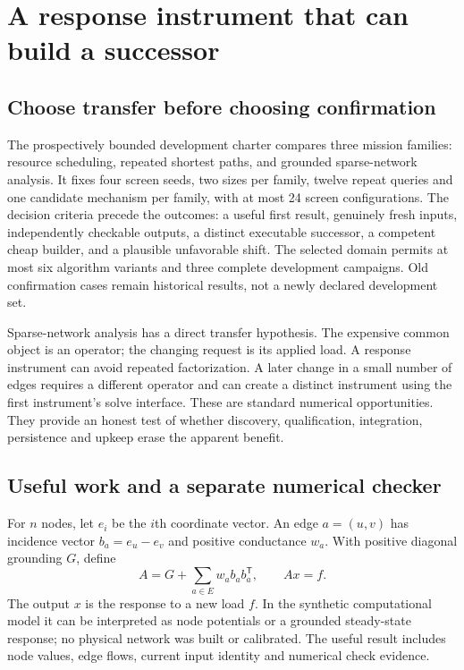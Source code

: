 \section{A response instrument that can build a successor}
\label{sec:methods}

\subsection{Choose transfer before choosing confirmation}

The prospectively bounded development charter compares three mission families: resource scheduling,
repeated shortest paths, and grounded sparse-network analysis. It fixes four screen seeds, two sizes per
family, twelve repeat queries and one candidate mechanism per family, with at most 24 screen configurations.
The decision criteria precede the outcomes: a useful first result, genuinely fresh inputs, independently
checkable outputs, a distinct executable successor, a competent cheap builder, and a plausible unfavorable
shift. The selected domain permits at most six algorithm variants and three complete development campaigns.
Old confirmation cases remain historical results, not a newly declared development set.

Sparse-network analysis has a direct transfer hypothesis. The expensive common object is an operator;
the changing request is its applied load. A response instrument can avoid repeated factorization. A later
change in a small number of edges requires a different operator and can create a distinct instrument using
the first instrument's solve interface. These are standard numerical opportunities. They provide an honest
test of whether discovery, qualification, integration, persistence and upkeep erase the apparent benefit.

\subsection{Useful work and a separate numerical checker}

For $n$ nodes, let $e_i$ be the $i$th coordinate vector. An edge $a=(u,v)$ has incidence vector
$b_a=e_u-e_v$ and positive conductance $w_a$. With positive diagonal grounding $G$, define
\begin{equation}
 A=G+\sum_{a\in E} w_a b_a b_a^{\mathsf T},\qquad A x=f.
 \label{eq:network}
\end{equation}
The output $x$ is the response to a new load $f$. In the synthetic computational model it can be interpreted
as node potentials or a grounded steady-state response; no physical network was built or calibrated.
The useful result includes node values, edge flows, current input identity and numerical check evidence.


